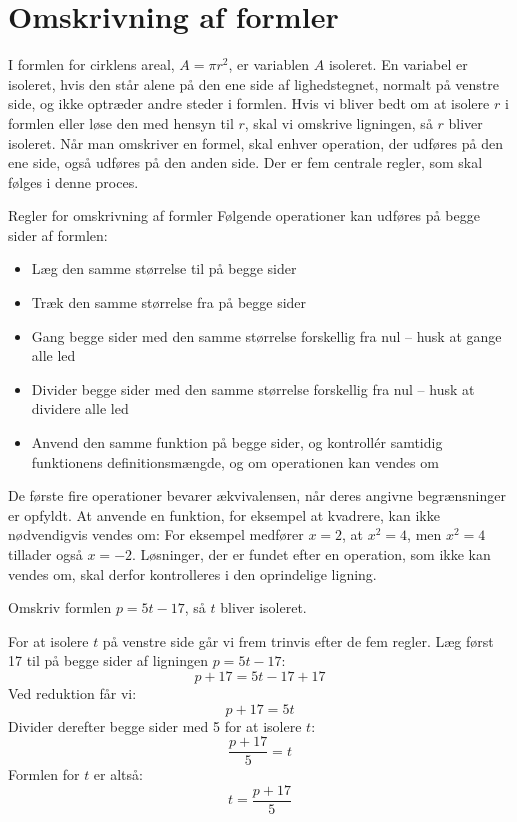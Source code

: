 \section{Omskrivning af formler}
I formlen for cirklens areal, \(A = \pi r^2\), er variablen \(A\) isoleret. En variabel er isoleret, hvis den står alene på den ene side af lighedstegnet, normalt på venstre side, og ikke optræder andre steder i formlen. Hvis vi bliver bedt om at isolere \(r\) i formlen eller løse den med hensyn til \(r\), skal vi omskrive ligningen, så \(r\) bliver isoleret. Når man omskriver en formel, skal enhver operation, der udføres på den ene side, også udføres på den anden side. Der er fem centrale regler, som skal følges i denne proces.

\begin{custombox}{Regler for omskrivning af formler}
Følgende operationer kan udføres på begge sider af formlen:
\begin{itemize}
    \item Læg den samme størrelse til på begge sider
    \item Træk den samme størrelse fra på begge sider
    \item Gang begge sider med den samme størrelse forskellig fra nul -- husk at gange alle led
    \item Divider begge sider med den samme størrelse forskellig fra nul -- husk at dividere alle led
    \item Anvend den samme funktion på begge sider, og kontrollér samtidig funktionens definitionsmængde, og om operationen kan vendes om
\end{itemize}
\end{custombox}

De første fire operationer bevarer ækvivalensen, når deres angivne begrænsninger er opfyldt. At anvende en funktion, for eksempel at kvadrere, kan ikke nødvendigvis vendes om: For eksempel medfører \(x=2\), at \(x^2=4\), men \(x^2=4\) tillader også \(x=-2\). Løsninger, der er fundet efter en operation, som ikke kan vendes om, skal derfor kontrolleres i den oprindelige ligning.

\begin{example} Omskriv formlen \(p = 5t - 17\), så \(t\) bliver isoleret.

\begin{solution}
 For at isolere \(t\) på venstre side går vi frem trinvis efter de fem regler. Læg først 17 til på begge sider af ligningen \(p = 5t - 17\):
\[
p + 17 = 5t - 17 + 17
\]
Ved reduktion får vi:
\[
p + 17 = 5t
\]
Divider derefter begge sider med 5 for at isolere \(t\):
\[
\frac{p + 17}{5} = t
\]
Formlen for \(t\) er altså:
\[
t = \frac{p + 17}{5}
\]   
\end{solution}    
\end{example}

